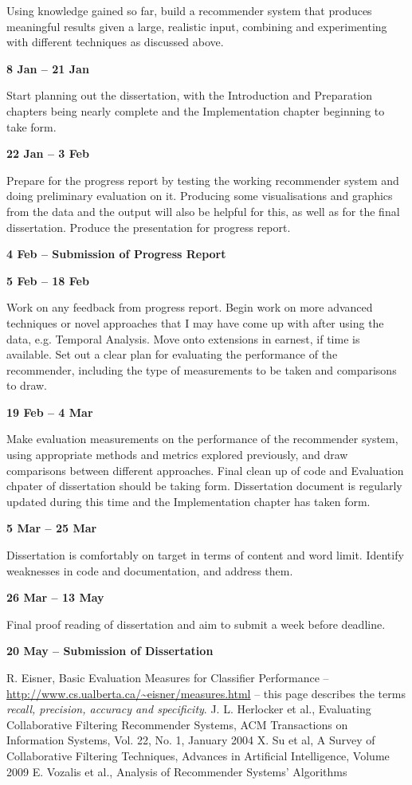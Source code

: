 Using knowledge gained so far, build a recommender system that produces meaningful results given a large, realistic input, combining and experimenting with different techniques as discussed above.

\textbf{8 Jan -- 21 Jan}

Start planning out the dissertation, with the Introduction and Preparation chapters being nearly complete and the Implementation chapter beginning to take form.

\textbf{22 Jan -- 3 Feb}

Prepare for the progress report by testing the working recommender system and doing preliminary evaluation on it. Producing some visualisations and graphics from the data and the output will also be helpful for this, as well as for the final dissertation. 
Produce the presentation for progress report.

\textbf{4 Feb -- Submission of Progress Report}

\textbf{5 Feb -- 18 Feb}

Work on any feedback from progress report.
Begin work on more advanced techniques or novel approaches that I may have come up with after using the data, e.g. Temporal Analysis. Move onto extensions in earnest, if time is available.
Set out a clear plan for evaluating the performance of the recommender, including the type of measurements to be taken and comparisons to draw.

\textbf{19 Feb -- 4 Mar}

Make evaluation measurements on the performance of the recommender system, using appropriate methods and metrics explored previously, and draw comparisons between different approaches.
Final clean up of code and Evaluation chpater of dissertation should be taking form.
Dissertation document is regularly updated during this time and the Implementation chapter has taken form.

\textbf{5 Mar -- 25 Mar}

Dissertation is comfortably on target in terms of content and word limit.
Identify weaknesses in code and documentation, and address them.

\textbf{26 Mar -- 13 May}

Final proof reading of dissertation and aim to submit a week before deadline.

\textbf{20 May -- Submission of Dissertation}


\begin{thebibliography}{}
  R. Eisner, Basic Evaluation Measures for Classifier Performance -- \url{http://www.cs.ualberta.ca/~eisner/measures.html} -- this page describes the terms \textit{recall, precision, accuracy and specificity}.
  J. L. Herlocker et al., Evaluating Collaborative Filtering Recommender Systems, ACM Transactions on Information Systems, Vol. 22, No. 1, January 2004
  X. Su et al, A Survey of Collaborative Filtering Techniques, Advances in Artificial Intelligence, Volume 2009
  E. Vozalis et al., Analysis of Recommender Systems' Algorithms
\end{thebibliography}
